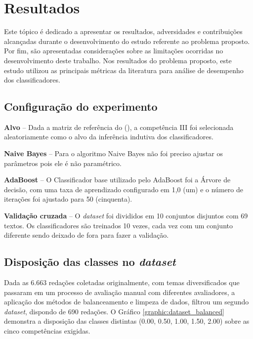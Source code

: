 \section{Resultados}

Este tópico é dedicado a apresentar os resultados, adversidades e contribuições 
alcançadas durante o desenvolvimento do estudo referente ao problema proposto. 
Por fim, são apresentadas considerações sobre as limitações ocorridas no 
desenvolvimento deste trabalho. Nos resultados do problema proposto, este 
estudo utilizou as principais métricas da literatura para análise de desempenho 
dos classificadores.

\subsection{Configuração do experimento}
\label{subsection:configuracao}

\textbf{Alvo} -- Dada a matriz de referência do \citeauthor{edital_enem:2016} 
(\citeyear{edital_enem:2016}), a competência III foi selecionada 
aleatoriamente como o alvo da inferência indutiva dos classificadores.

\textbf{Naive Bayes} -- Para o algoritmo Naive Bayes não foi preciso ajustar os
parâmetros pois ele é não paramétrico.

\textbf{AdaBoost} -- O Classificador base utilizado pelo AdaBoost foi a
Árvore de decisão, com uma taxa de aprendizado configurado em 1,0 (um) e o 
número de iterações foi ajustado para 50 (cinquenta).

\textbf{Validação cruzada} -- O \textit{dataset} foi divididos em 10 conjuntos 
disjuntos com 69 textos. Os classificadores são treinados 10 vezes, cada 
vez com um conjunto diferente sendo deixado de fora para fazer a validação.

\subsection{Disposição das classes no \textit{dataset}}
\label{subsection:balanceamento}

Dada as 6.663 redações coletadas originalmente, com temas diversificados que 
passaram em um processo de avaliação manual com diferentes avaliadores, a 
aplicação dos métodos de balanceamento e limpeza de dados, filtrou um segundo 
\textit{dataset}, dispondo de 690 redações. O Gráfico 
\ref{graphic:dataset_balanced} demonstra a disposição das classes distintas 
(0.00, 0.50, 1.00, 1.50, 2.00) sobre as cinco competências exigidas.

